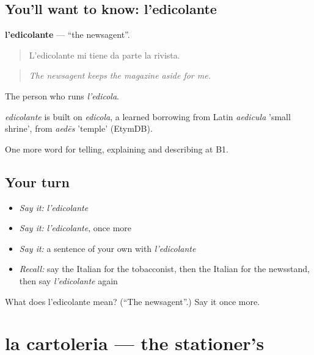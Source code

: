 \subsection*{You'll want to know: l'edicolante}
\textbf{l'edicolante} — \textquotedblleft{}the newsagent\textquotedblright{}.

\begin{quote}
L'edicolante mi tiene da parte la rivista.
\end{quote}

\begin{quote}
\emph{The newsagent keeps the magazine aside for me.}
\end{quote}

The person who runs \emph{l'edicola}.

\begin{cousinweb}
\emph{edicolante} is built on \emph{edicola}, a learned borrowing from Latin \emph{aedicula} 'small shrine', from \emph{aedēs} 'temple' (EtymDB).
\end{cousinweb}

\begin{grammarlens}[title={What you've built}]
One more word for telling, explaining and describing at B1.
\end{grammarlens}

\subsection*{Your turn}
\begin{itemize}
\raggedright
  \item \emph{Say it:} \emph{l'edicolante}
  \item \emph{Say it:} \emph{l'edicolante}, once more
  \item \emph{Say it:} a sentence of your own with \emph{l'edicolante}
  \item \emph{Recall:} say the Italian for the tobacconist, then the Italian for the newsstand, then say \emph{l'edicolante} again
\end{itemize}

\begin{tcolorbox}[breakable,colback=teal!4,colframe=teal!35!black,title={Before you move on}]
What does l'edicolante mean? (\textquotedblleft{}The newsagent\textquotedblright{}.) Say it once more.
\end{tcolorbox}
\section[la cartoleria]{la cartoleria — the stationer's}


